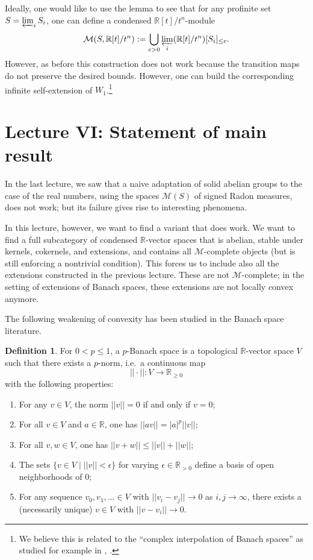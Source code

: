 \documentclass[11pt]{amsbook}
\numberwithin{equation}{section}
\numberwithin{theorem}{section}
\theoremstyle{definition}
\newtheorem{definition}[theorem]{Definition}
\begin{document}
Ideally, one would like to use the lemma to see that for any profinite set $S=\varprojlim_i S_i$, one can define a condensed $\mathbb R[t]/t^n$-module
\[
\mathcal M(S,\mathbb R[t]/t^n) := \bigcup_{c>0} \varprojlim_i (\mathbb R[t]/t^n)[S_i]_{\leq c}.
\]
However, as before this construction does not work because the transition maps do not preserve the desired bounds. However, one can build the corresponding infinite self-extension of $W_1$.\footnote{We believe this is related to the ``complex interpolation of Banach spaces'' as studied for example in \cite{ComplexInterpolationBanach}, \cite{ComplexInterpolationHilbert}.}

\newpage

\section{Lecture VI: Statement of main result}

In the last lecture, we saw that a naive adaptation of solid abelian groups to the case of the real numbers, using the spaces $\mathcal M(S)$ of signed Radon measures, does not work; but its failure gives rise to interesting phenomena.

In this lecture, however, we want to find a variant that does work. We want to find a full subcategory of condensed $\mathbb R$-vector spaces that is abelian, stable under kernels, cokernels, and extensions, and contains all $\mathcal M$-complete objects (but is still enforcing a nontrivial condition). This forces us to include also all the extensions constructed in the previous lecture. These are not $\mathcal M$-complete; in the setting of extensions of Banach spaces, these extensions are not locally convex anymore.

The following weakening of convexity has been studied in the Banach space literature.

\begin{definition}\label{def:pbanach} For $0<p\leq 1$, a $p$-Banach space is a topological $\mathbb R$-vector space $V$ such that there exists a $p$-norm, i.e.~a continuous map
\[
||\cdot||: V\to \mathbb R_{\geq 0}
\]
with the following properties:
\begin{enumerate}
\item For any $v\in V$, the norm $||v||=0$ if and only if $v=0$;
\item For all $v\in V$ and $a\in \mathbb R$, one has $||av|| = |a|^p ||v||$;
\item For all $v,w\in V$, one has $||v+w||\leq ||v||+||w||$;
\item The sets $\{v\in V\mid ||v||<\epsilon\}$ for varying $\epsilon\in \mathbb R_{>0}$ define a basis of open neighborhoods of $0$;
\item For any sequence $v_0,v_1,\ldots\in V$ with $||v_i-v_j||\to 0$ as $i,j\to\infty$, there exists a (necessarily unique) $v\in V$ with $||v-v_i||\to 0$.
\end{enumerate}
\end{definition}
\end{document}
